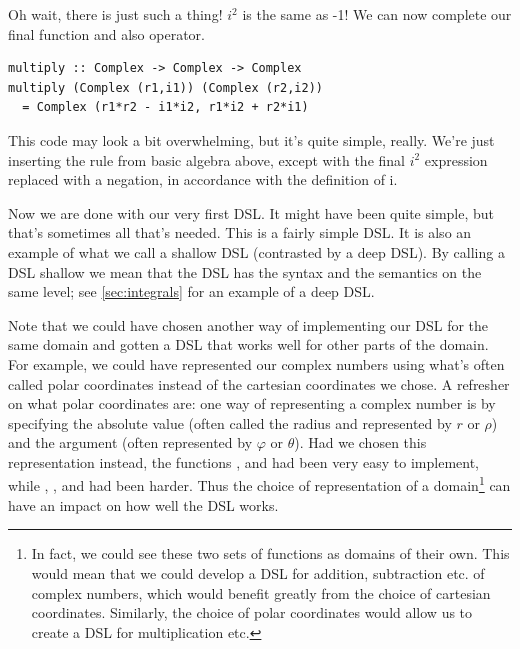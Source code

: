 Oh wait, there is just such a thing! $i^2$ is the same as -1! We can now complete our final function and also operator.

\begin{verbatim}
multiply :: Complex -> Complex -> Complex
multiply (Complex (r1,i1)) (Complex (r2,i2))
  = Complex (r1*r2 - i1*i2, r1*i2 + r2*i1)
\end{verbatim}
This code may look a bit overwhelming, but it's quite simple, really. We're just inserting the rule from basic algebra above, except with the final $i^2$ expression replaced with a negation, in accordance with the definition of i.


\begin{newtext}
Now we are done with our very first DSL. It might have been quite simple, but that's sometimes all that's needed. 
This is a fairly simple DSL. 
It is also an example of what we call a shallow DSL (contrasted by a deep DSL). By calling a DSL shallow we mean that the DSL has the syntax and the semantics on the same level; see \ref{sec:integrals} for an example of a deep DSL.


Note that we could have chosen another way of implementing our DSL for the same domain and gotten a DSL that works well for other parts of the domain. For example, we could have represented our complex numbers using what's often called polar coordinates instead of the cartesian coordinates we chose. 
A refresher on what polar coordinates are: one way of representing a complex number is by specifying the absolute value (often called the radius and represented by $r$ or $\rho$) and the argument (often represented by $\varphi$ or $\theta$). 
Had we chosen this representation instead, the functions ,  and  had been very easy to implement, while , ,  and  had been harder. Thus the choice of representation of a domain\footnote{In fact, we could see these two sets of functions as domains of their own. This would mean that we could develop a DSL for addition, subtraction etc. of complex numbers, which would benefit greatly from the choice of cartesian coordinates. Similarly, the choice of polar coordinates would allow us to create a DSL for multiplication etc.} can have an impact on how well the DSL works. 
\end{newtext}

